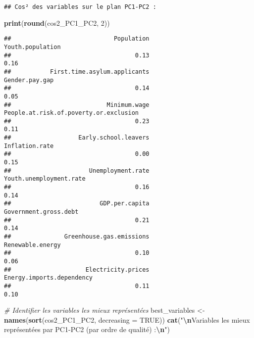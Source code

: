 \documentclass[
]{article}
\newenvironment{Shaded}{\begin{snugshade}}{\end{snugshade}}
\newcommand{\AttributeTok}[1]{\textcolor[rgb]{0.13,0.29,0.53}{#1}}
\newcommand{\CommentTok}[1]{\textcolor[rgb]{0.56,0.35,0.01}{\textit{#1}}}
\newcommand{\ConstantTok}[1]{\textcolor[rgb]{0.56,0.35,0.01}{#1}}
\newcommand{\DecValTok}[1]{\textcolor[rgb]{0.00,0.00,0.81}{#1}}
\newcommand{\FunctionTok}[1]{\textcolor[rgb]{0.13,0.29,0.53}{\textbf{#1}}}
\newcommand{\NormalTok}[1]{#1}
\newcommand{\OtherTok}[1]{\textcolor[rgb]{0.56,0.35,0.01}{#1}}
\newcommand{\SpecialCharTok}[1]{\textcolor[rgb]{0.81,0.36,0.00}{\textbf{#1}}}
\newcommand{\StringTok}[1]{\textcolor[rgb]{0.31,0.60,0.02}{#1}}
\begin{document}
\begin{verbatim}
## Cos² des variables sur le plan PC1-PC2 :
\end{verbatim}

\begin{Shaded}
\begin{Highlighting}[]
\FunctionTok{print}\NormalTok{(}\FunctionTok{round}\NormalTok{(cos2\_PC1\_PC2, }\DecValTok{2}\NormalTok{))}
\end{Highlighting}
\end{Shaded}

\begin{verbatim}
##                             Population                       Youth.population 
##                                   0.13                                   0.16 
##           First.time.asylum.applicants                         Gender.pay.gap 
##                                   0.14                                   0.05 
##                           Minimum.wage People.at.risk.of.poverty.or.exclusion 
##                                   0.23                                   0.11 
##                   Early.school.leavers                         Inflation.rate 
##                                   0.00                                   0.15 
##                      Unemployment.rate                Youth.unemployment.rate 
##                                   0.16                                   0.14 
##                         GDP.per.capita                  Government.gross.debt 
##                                   0.21                                   0.14 
##               Greenhouse.gas.emissions                       Renewable.energy 
##                                   0.10                                   0.06 
##                     Electricity.prices              Energy.imports.dependency 
##                                   0.11                                   0.10
\end{verbatim}

\begin{Shaded}
\begin{Highlighting}[]
\CommentTok{\# Identifier les variables les mieux représentées}
\NormalTok{best\_variables }\OtherTok{\textless{}{-}} \FunctionTok{names}\NormalTok{(}\FunctionTok{sort}\NormalTok{(cos2\_PC1\_PC2, }\AttributeTok{decreasing =} \ConstantTok{TRUE}\NormalTok{))}
\FunctionTok{cat}\NormalTok{(}\StringTok{"}\SpecialCharTok{\textbackslash{}n}\StringTok{Variables les mieux représentées par PC1{-}PC2 (par ordre de qualité) :}\SpecialCharTok{\textbackslash{}n}\StringTok{"}\NormalTok{)}
\end{Highlighting}
\end{Shaded}
\end{document}
